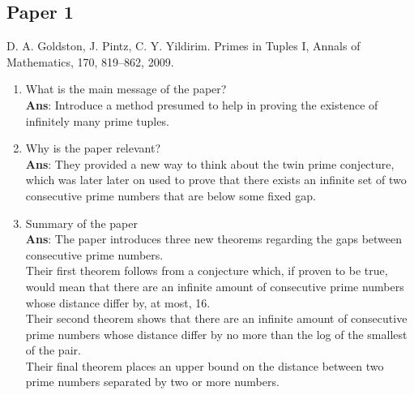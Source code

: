 \documentclass[11pt]{article}
\begin{document}
\subsection*{Paper 1}
D. A. Goldston, J. Pintz, C. Y. Yildirim. Primes in Tuples I, Annals of Mathematics, 170, 819–862, 2009.
\begin{enumerate}[label=(\alph*)]
	\item What is the main message of the paper? \\ \textbf{Ans}: Introduce a method presumed to help in proving the existence of infinitely many prime tuples.
	\item Why is the paper relevant? \\ \textbf{Ans}: They provided a new way to think about the twin prime conjecture, which was later later on used to prove that there exists an infinite set of two consecutive prime numbers that are below some fixed gap.
	\item Summary of the paper \\ \textbf{Ans}: The paper introduces three new theorems  regarding the gaps between consecutive prime numbers.\\ Their first theorem follows from a conjecture which, if proven to be true, would mean that there are an infinite amount of consecutive prime numbers whose distance differ by, at most, 16.\\ Their second theorem shows that there are an infinite amount of consecutive prime numbers whose distance differ by no more than the log of the smallest of the pair.\\ Their final theorem places an upper bound on the distance between two prime numbers separated by two or more numbers.
\end{enumerate}
\end{document}
